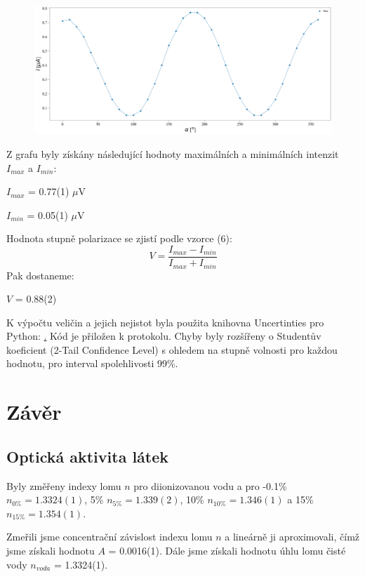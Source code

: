 \documentclass[a4paper,11pt]{article}
\begin{document}
\newpage
                \begin{figure}[ht!]
                    \centering
                    \includegraphics[scale=0.3]{intens}
                    \captionsetup{justification=centering, font=footnotesize}
                    \label{fig:intens}
                \end{figure}
    \begin{minipage}[t]{0.5\textwidth} 
                Z grafu byly získány následující hodnoty maximálních a minimálních intenzit $I_{max}$ a $I_{min}$:
                \begin{center}
                    $I_{max}$ = 0.77(1) $\mu$V
                    \vspace{5pt}
                    \par $I_{min}$ = 0.05(1) $\mu$V
                \end{center}
                Hodnota stupně polarizace se zjistí podle vzorce (6): 
                \begin{equation}
                    V = \frac{I_{max} - I_{min}}{I_{max} + I_{min}}
                \end{equation}
                Pak dostaneme:
                \begin{center}
                    $V$ = 0.88(2)
                \end{center}
                \par K výpočtu veličin a jejich nejistot byla použita knihovna Uncertinties pro Python: \href{pypi.org/project/uncertainties}. Kód je přiložen k protokolu. Chyby byly rozšířeny o Studentův koeficient (2-Tail Confidence Level) s ohledem na stupně volnosti pro každou hodnotu, pro interval spolehlivosti 99\%.
        \section{Závěr}  
            \subsection{Optická aktivita látek}
                Byly změřeny indexy lomu $n$ pro diionizovanou vodu a pro -0.1\% $n_{0\%} = 1.3324(1)$, 5\% $n_{5\%} = 1.339(2)$, 10\% $n_{10\%} = 1.346(1)$ a 15\% $n_{15\%} = 1.354(1)$. 
                \par Zmeřili jsme concentrační závislost indexu lomu $n$ a lineárně ji aproximovali, čímž jsme získali hodnotu $A$ = 0.0016(1). Dále jsme získali hodnotu úhlu lomu čisté vody $n_{voda}$ = 1.3324(1).
    \end{minipage}
\end{document}
